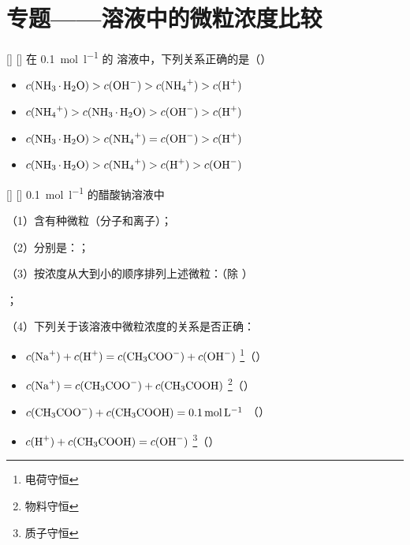 \section*{专题——溶液中的微粒浓度比较}
\label{sect:专题——溶液中的微粒浓度比较}

        \begin{xmp}
        [专题——溶液中的微粒浓度比较例 1]
        {}
        []
        []
        在 \SI{0.1}{\mole\per\litre} 的  溶液中，下列关系正确的是（）
        \begin{itemize}
            \item[A.] \(c(\cemh{NH3.H2O}) > c(\cemh{OH^-}) > c(\cemh{NH4+}) > c(\cemh{H+})\)
            \item[B.] \(c(\cemh{NH4+}) > c(\cemh{NH3.H2O}) > c(\cemh{OH^-}) > c(\cemh{H+})\)
            \item[C.] \(c(\cemh{NH3.H2O}) > c(\cemh{NH4+}) = c(\cemh{OH^-}) > c(\cemh{H+})\)
            \item[D.] \(c(\cemh{NH3.H2O}) > c(\cemh{NH4+}) > c(\cemh{H+}) > c(\cemh{OH^-})\)
        \end{itemize}
    \end{xmp}

    \begin{xmp}
        [专题——溶液中的微粒浓度比较例 2]
        {}
        []
        []
        \SI{0.1}{\mole\per\litre} 的醋酸钠溶液中

        （1）含有\uline{}种微粒（分子和离子）；

        （2）分别是：\uline{}；

        （3）按浓度从大到小的顺序排列上述微粒：（除 ）
        
        \uline{}；

        （4）下列关于该溶液中微粒浓度的关系是否正确：
        \begin{itemize}
            \item[A.] \(c(\cemh{Na+}) + c(\cemh{H+}) = c(\cemh{CH3COO^-}) + c(\cemh{OH^-})\) \dotfill\footnote{电荷守恒}（\makebox[1.5em]{\hcmark}）
            \item[B.] \(c(\cemh{Na+}) = c(\cemh{CH3COO^-}) + c(\cemh{CH3COOH})\)             \dotfill\footnote{物料守恒}（\makebox[1.5em]{\hcmark}）
            \item[C.] \(c(\cemh{CH3COO^-}) + c(\cemh{CH3COOH}) = \SI{0.1}{\mole\per\litre}\) \dotfill（\makebox[1.5em]{\hcmark}）
            \item[D.] \(c(\cemh{H+}) + c(\cemh{CH3COOH}) = c(\cemh{OH^-})\)                  \dotfill\footnote{质子守恒}（\makebox[1.5em]{\hcmark}）
        \end{itemize}
    \end{xmp}

